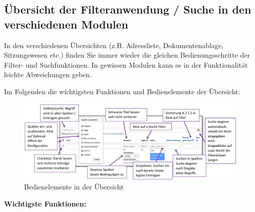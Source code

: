 \pagebreak
\subsection{Übersicht der Filteranwendung / Suche in den verschiedenen Modulen}

In den verschiedenen Übersichten (z.B. Adressliste, Dokumentenablage, Sitzungswesen etc.) finden Sie immer wieder die gleichen Bedienungsschritte der Filter- und Suchfunktionen. In gewissen Modulen kann es in der Funktionalität leichte Abweichungen geben. 

\vspace{\baselineskip}

Im Folgenden die wichtigsten Funktionen und Bedienelemente der Übersicht:

\begin{figure}[H]
\hspace*{-2.3cm}
\includegraphics[width=1.25\linewidth]{../chapters/02_GettingStarted/pictures/uebersicht_Bedienung}
\caption{Bedienelemente in der Übersicht}
\end{figure}



\textbf{Wichtigste Funktionen:}

\vspace{\baselineskip}

